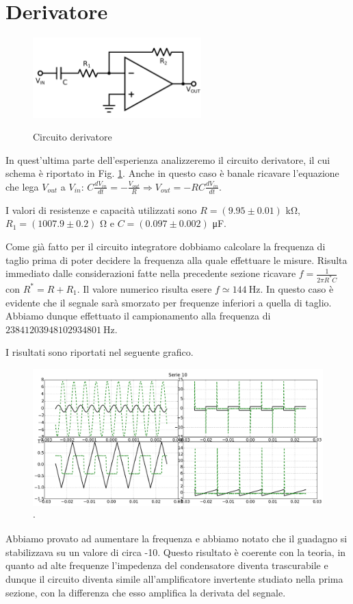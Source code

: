 \section{Derivatore}

\begin{figure}
	\caption{Circuito derivatore}
	\includegraphics[width=65mm]{ccder.pdf}
	\label{fig:ccder}
\end{figure}

In quest'ultima parte dell'esperienza analizzeremo il circuito derivatore, il cui schema è riportato in Fig. \ref{fig:ccder}.
Anche in questo caso è banale ricavare l'equazione che lega $V_{out}$ a $V_{in}$: $C\frac{dV_{in}}{dt}=-\frac{V_{out}}{R}\Rightarrow V_{out}=-RC\frac{dV_{in}}{dt}$.

I valori di resistenze e capacità utilizzati sono $R=(9.95 \pm 0.01)$ \si{\kilo\ohm}, $R_1=(1007.9 \pm 0.2)$ \si{\ohm} e $C=(0.097 \pm 0.002)$ \si{\micro\farad}.

Come già fatto per il circuito integratore dobbiamo calcolare la frequenza di taglio prima di poter decidere la frequenza alla quale effettuare le misure.
Risulta immediato dalle considerazioni fatte nella precedente sezione ricavare $f=\frac{1}{2 \pi R^* C}$ con $R^*=R+R_1$.
Il valore numerico risulta esere $f \simeq \SI{144}{\hertz}$.
In questo caso è evidente che il segnale sarà smorzato per frequenze inferiori a quella di taglio. Abbiamo dunque effettuato il campionamento alla frequenza di $\SI{23841203948102934801}{\hertz}$.

I risultati sono riportati nel seguente grafico.

\begin{figure}[h]
	\centering
			\includegraphics[width=.9\textwidth]{der_serie_10.pdf}
			\caption{$\cdot$}
			\label{fig:der}
\end{figure}

Abbiamo provato ad aumentare la frequenza e abbiamo notato che il guadagno si stabilizzava su un valore di circa -10.
Questo risultato è coerente con la teoria, in quanto ad alte frequenze l'impedenza del condensatore diventa trascurabile e dunque il circuito diventa simile all'amplificatore invertente studiato nella prima sezione, con la differenza che esso amplifica la derivata del segnale.